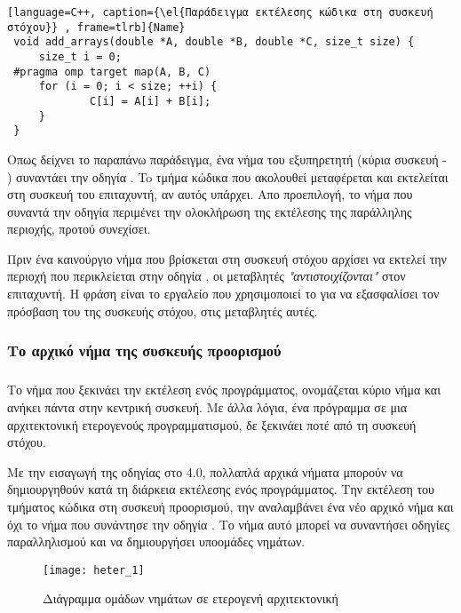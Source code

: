 \begin{lstlisting}[language=C++, caption={\el{Παράδειγμα εκτέλεσης κώδικα στη συσκευή στόχου}} , frame=tlrb]{Name}
 void add_arrays(double *A, double *B, double *C, size_t size) {
     size_t i = 0;
 #pragma omp target map(A, B, C)
     for (i = 0; i < size; ++i) {
             C[i] = A[i] + B[i];
     }
 }
\end{lstlisting}
\clearpage
Οπως δείχνει το παραπάνω παράδειγμα, ένα νήμα του εξυπηρετητή (κύρια συσκευή - \emph{}) συναντάει την οδηγία \emph{}. To τμήμα κώδικα που ακολουθεί μεταφέρεται και εκτελείται στη συσκευή του επιταχυντή, αν αυτός υπάρχει. Απο προεπιλογή, το νήμα που συναντά την οδηγία περιμένει την ολοκλήρωση της εκτέλεσης της παράλληλης περιοχής, προτού συνεχίσει.

Πριν ένα καινούργιο νήμα που βρίσκεται στη συσκευή στόχου αρχίσει να εκτελεί την περιοχή που περικλείεται στην οδηγία \emph{}, οι μεταβλητές  \emph{} \emph{"αντιστοιχίζονται"} στον επιταχυντή. Η φράση \emph{} είναι το εργαλείο που χρησιμοποιεί το \emph{} για να εξασφαλίσει τον πρόσβαση του της συσκευής στόχου, στις μεταβλητές αυτές.


\subsubsection{Το αρχικό νήμα της συσκευής προορισμού}
\subparagraph{}
Το νήμα που ξεκινάει την εκτέλεση ενός προγράμματος, ονομάζεται κύριο νήμα και ανήκει πάντα στην κεντρική συσκευή. Με άλλα λόγια, ένα πρόγραμμα σε μια αρχιτεκτονική ετερογενούς προγραμματισμού, δε ξεκινάει ποτέ από τη συσκευή στόχου.

Με την εισαγωγή της οδηγίας \emph{} στο \emph{} 4.0, πολλαπλά αρχικά νήματα μπορούν να δημιουργηθούν κατά τη διάρκεια εκτέλεσης ενός προγράμματος. Την εκτέλεση του τμήματος κώδικα στη συσκευή προορισμού, την αναλαμβάνει ένα νέο αρχικό νήμα και όχι το νήμα που συνάντησε την οδηγία \emph{}. Το νήμα αυτό μπορεί να συναντήσει οδηγίες παραλληλισμού και να δημιουργήσει υποομάδες νημάτων.
\ \\
\begin{figure}[h]
\texttt{[image: heter\_1]}
\centering
\captionsetup{justification=centering, singlelinecheck=false}
	\caption{Διάγραμμα ομάδων νημάτων σε ετερογενή αρχιτεκτονική}
\label{fig:heter_1}
\end{figure}
\clearpage





